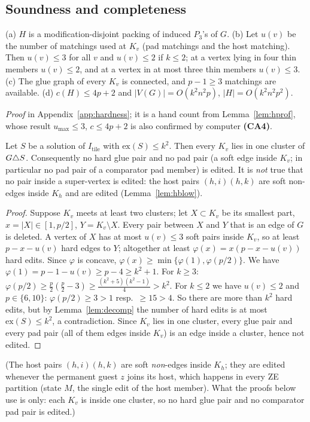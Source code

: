 \subsection{Soundness and completeness}\label{sec:hsound}
\begin{lemma}\label{lem:hpar}
(a) $H$ is a modification-disjoint packing of induced $P_3$'s of $G$. (b) Let $u(v)$ be the number of matchings used at $K_v$ (pad matchings and the host matching). Then $u(v)\le3$ for all $v$ and $u(v)\le 2$ if $k\le2$; at a vertex lying in four thin members $u(v)\le2$, and at a vertex in at most three thin members $u(v)\le3$. (c) The glue graph of every $K_v$ is connected, and $p-1\ge3$ matchings are available. (d) $c(H)\le 4p+2$ and $|V(G)|=O(k^2n^2p)$, $|H|=O(k^2n^2p^2)$.
\end{lemma}
\emph{Proof} in Appendix~\ref{app:hardness}; it is a hand count from Lemma~\ref{lem:hprof}, whose result $u_{\max}\le3$, $c\le4p+2$ is also confirmed by computer \textbf{(CA4)}.

\begin{lemma}\label{lem:hsplit}
Let $S$ be a solution of $I_{\mathrm{tile}}$ with $\mathrm{ex}(S)\le k^2$. Then every $K_v$ lies in one cluster of $G\triangle S$. Consequently no hard glue pair and no pad pair (a soft edge inside $K_v$; in particular no pad pair of a comparator pad member) is edited. It is \emph{not} true that no pair inside a super-vertex is edited: the host pairs $(h,i)(h,k)$ are soft non-edges inside $K_h$ and are edited (Lemma~\ref{lem:hblow}).
\end{lemma}
\begin{proof}
Suppose $K_v$ meets at least two clusters; let $X\subset K_v$ be its smallest part, $x=|X|\in[1,p/2]$, $Y=K_v\setminus X$. Every pair between $X$ and $Y$ that is an edge of $G$ is deleted. A vertex of $X$ has at most $u(v)\le3$ soft pairs inside $K_v$, so at least $p-x-u(v)$ hard edges to $Y$; altogether at least $\varphi(x)=x(p-x-u(v))$ hard edits. Since $\varphi$ is concave, $\varphi(x)\ge\min\{\varphi(1),\varphi(p/2)\}$. We have $\varphi(1)=p-1-u(v)\ge p-4\ge k^2+1$. For $k\ge3$: $\varphi(p/2)\ge\frac p2(\frac p2-3)\ge\frac{(k^2+5)(k^2-1)}4>k^2$. For $k\le2$ we have $u(v)\le2$ and $p\in\{6,10\}$: $\varphi(p/2)\ge3>1$ resp.\ $\ge15>4$. So there are more than $k^2$ hard edits, but by Lemma~\ref{lem:decomp} the number of hard edits is at most $\mathrm{ex}(S)\le k^2$, a contradiction. Since $K_v$ lies in one cluster, every glue pair and every pad pair (all of them edges inside $K_v$) is an edge inside a cluster, hence not edited.
\end{proof}
(The host pairs $(h,i)(h,k)$ are soft \emph{non}-edges inside $K_h$; they are edited whenever the permanent guest $z$ joins its host, which happens in every ZE partition (state $M$, the single edit of the host member). What the proofs below use is only: each $K_v$ is inside one cluster, so no hard glue pair and no comparator pad pair is edited.)

